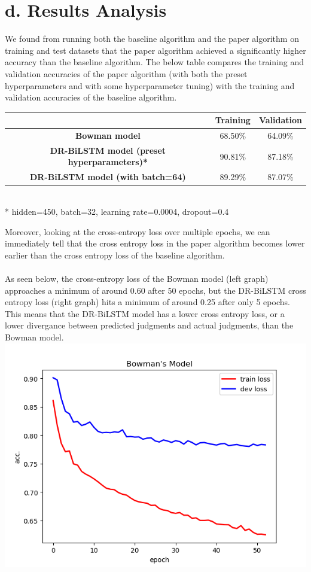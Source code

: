 \documentclass[12pt,letterpaper]{article}
\begin{document}
\section*{d. Results Analysis}
We found from running both the baseline algorithm and the paper algorithm on training and test datasets that the paper algorithm achieved a significantly higher accuracy than the baseline algorithm. The below table compares the training and validation accuracies of the paper algorithm (with both the preset hyperparameters and with some hyperparameter tuning) with the training and validation accuracies of the baseline algorithm. 
\begin{center}
    \begin{tabular}{| c | c | c |}
        \hline
         & \textbf{Training} & \textbf{Validation}\\ \hline
        \textbf{Bowman model} & 68.50$\%$ & 64.09$\%$
        \\ \hline
        \textbf{DR-BiLSTM model (preset hyperparameters)*} & 90.81$\%$ & 87.18$\%$\\ \hline
        \textbf{DR-BiLSTM model (with batch=64)} & 89.29$\%$ & 87.07$\%$\\ \hline
    \end{tabular} \\
    * hidden=450, batch=32, learning rate=0.0004, dropout=0.4 \\
\end{center}
Moreover, looking at the cross-entropy loss over multiple epochs, we can immediately tell that the cross entropy loss in the paper algorithm becomes lower earlier than the cross entropy loss of the baseline algorithm. \\
\\
As seen below, the cross-entropy loss of the Bowman model (left graph) approaches a minimum of around 0.60 after 50 epochs, but the DR-BiLSTM cross entropy loss (right graph) hits a minimum of around 0.25 after only 5 epochs. This means that the DR-BiLSTM model has a lower cross entropy loss, or a lower divergance between predicted judgments and actual judgments, than the Bowman model.\\
\includegraphics[scale=0.53]{Bowmanxent.PNG}
\end{document}
